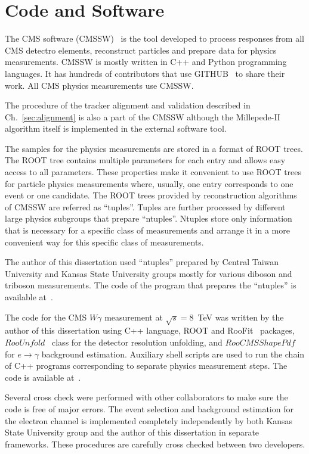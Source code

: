 \chapter{Code and Software}
\label{sec:Code}


The CMS software (CMSSW)~\cite{ref_CMSSW} is the tool developed to process responses from all CMS detectro elements, reconstruct particles and prepare data for physics measurements. CMSSW is mostly written in C++ and Python programming languages. It has hundreds of contributors that use GITHUB~\cite{ref_GITHUB} to share their work. All CMS physics measurements use CMSSW.

The procedure of the tracker alignment and validation described in Ch.~\ref{sec:alignment} is also a part of the CMSSW although the Millepede-II algorithm itself is implemented in the external software tool.

The samples for the physics measurements are stored in a format of ROOT trees. The ROOT tree contains multiple parameters for each entry and allows easy access to all parameters. These properties make it convenient to use ROOT trees for particle physics measurements where, usually, one entry corresponds to one event or one candidate. The ROOT trees provided by reconstruction algorithms of CMSSW are referred as ``tuples''. Tuples are further processed by different large physics subgroups that prepare ``ntuples''. Ntuples store only information that is necessary for a specific class of measurements and arrange it in a more convenient way for this specific class of measurements.  

The author of this dissertation used ``ntuples'' prepared by Central Taiwan University and Kansas State University groups mostly for various diboson and triboson measurements. The code of the program that prepares the ``ntuples'' is available at~\cite{ref_ggNtuplizer}.

The code for the CMS $W\gamma$ measurement at $\sqrt{s}=8$~TeV was written by the author of this dissertation using C++ language, ROOT and RooFit~\cite{ref_RooFit} packages, $RooUnfold$~\cite{ref_RooUnfold} class for the detector resolution unfolding, and $RooCMSShapePdf$~\cite{ref_RooCMSShapePdf} for $e\rightarrow\gamma$ background estimation. Auxiliary shell scripts are used to run the chain of C++ programs corresponding to separate physics measurement steps. The code is available at~\cite{ref_GITHUB}.

Several cross check were performed with other collaborators to make sure the code is free of major errors. The event selection and background estimation for the electron channel is implemented completely independently by both Kansas State University group and the author of this dissertation in separate frameworks. These procedures are carefully cross checked between two developers.  
